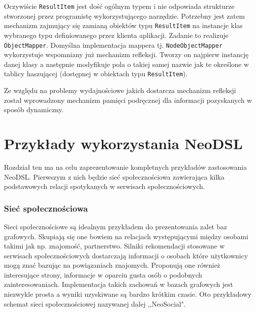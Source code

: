 \documentclass[brudnopis]{xmgr}
\begin{document}
Oczywiście \texttt{ResultItem} jest dość ogólnym typem i nie odpowiada strukturze stworzonej przez programistę wykorzystującego narzędzie. Potrzebny jest zatem mechanizm zajmujący się zamianą obiektów typu \texttt{ResultItem} na instancje klas wybranego typu definiowanego przez klienta aplikacji. Zadanie to realizuje \texttt{ObjectMapper}. Domyślna implementacja mappera tj. \texttt{NodeObjectMapper} wykorzystuje wspomniany już mechanizm refleksji. Tworzy on najpierw instancję danej klasy a następnie modyfikuje pola o takiej samej nazwie jak te określone w tablicy haszującej (dostępnej w obiektach typu \texttt{ResultItem}).

Ze względu na problemy wydajnościowe jakich dostarcza mechanizm refleksji został wprowadzony mechanizm pamięci podręcznej dla informacji pozyskanych w sposób dynamiczny.

\chapter{Przykłady wykorzystania NeoDSL}

Rozdział ten ma na celu zaprezentowanie kompletnych przykładów zastosowania NeoDSL. Pierwszym z nich będzie sieć społecznościowa zawierająca kilka podstawowych relacji spotykanych w serwisach społecznościowych.

\subsection{Sieć społecznościowa}

Sieci społecznościowe są idealnym przykładem do prezentowania zalet baz grafowych. Skupiają się one bowiem na relacjach występującymi między osobami takimi jak np. znajomość, partnerstwo. Silniki rekomendacji stosowane w serwisach społecznościowych dostarczają informacji o osobach które użytkownicy mogą znać bazując na powiązaniach znajomych. Proponują one również interesujące strony, informacje w oparciu gusta osób o podobnych zainteresowaniach. Implementacja takich zachowań w bazach grafowych jest niezwykle prosta a wyniki uzyskiwane są bardzo krótkim czasie. Oto przykładowy schemat sieci społecznościowej nazywanej dalej ,,NeoSocial".
\end{document}
